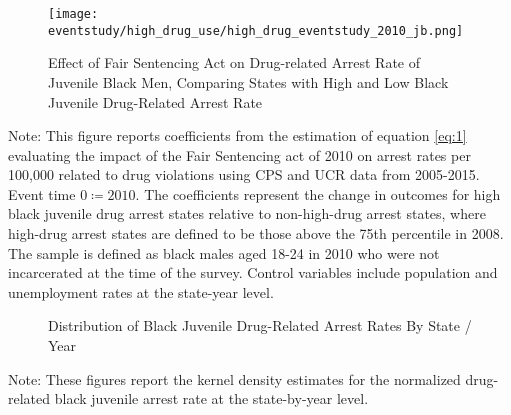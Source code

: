 \clearpage

\begin{figure}[h]
    \caption{Effect of Fair Sentencing Act on Drug-related Arrest Rate of Juvenile Black Men, Comparing States with High and Low Black Juvenile Drug-Related Arrest Rate}
    \centering
    \texttt{[image: eventstudy/high\_drug\_use/high\_drug\_eventstudy\_2010\_jb.png]}
    \label{fig:jb_es_2010}
  \end{figure}

  \begin{footnotesize}
    \noindent Note: This figure reports coefficients from the estimation of equation \ref{eq:1} evaluating the impact of the Fair Sentencing act of 2010 on arrest rates per 100,000 related to drug violations using CPS and UCR data from 2005-2015. Event time $0 \coloneqq 2010$. The coefficients represent the change in outcomes for high black juvenile drug arrest states relative to non-high-drug arrest states, where high-drug arrest states are defined to be those above the 75th percentile in 2008. The sample is defined as black males aged 18-24 in 2010 who were not incarcerated at the time of the survey. Control variables include population and unemployment rates at the state-year level. 
  \end{footnotesize}

  \clearpage

  \begin{figure}[h]
    \centering
    \caption{Distribution of Black Juvenile Drug-Related Arrest Rates By State / Year}%
    \qquad
    \label{fig:density_jb}%
  \end{figure}
  \begin{footnotesize}
    \noindent Note: These figures report the kernel density estimates for the normalized drug-related black juvenile arrest rate at the state-by-year level. 
  \end{footnotesize}

